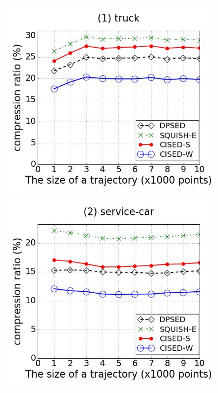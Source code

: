 \begin{figure}[tb!]
\centering
\includegraphics[scale = 0.240]{figures/Exp-CR-size-truck.png}
\includegraphics[scale = 0.240]{figures/Exp-CR-size-service.png}

\end{figure}

